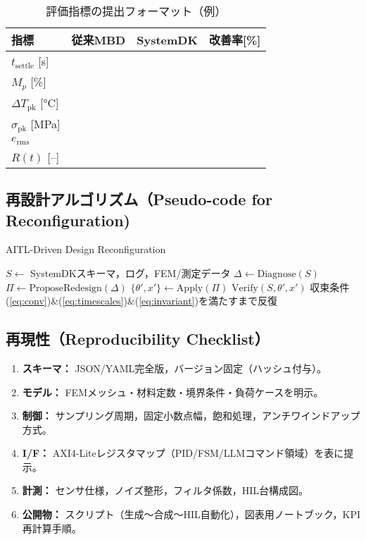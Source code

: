 \begin{table}[t]
\caption{評価指標の提出フォーマット（例）}
\label{tab:kpi}
\centering
\begin{tabular}{lccc}
\toprule
指標 & 従来MBD & SystemDK & 改善率[\%] \\
\midrule
$t_{\mathrm{settle}}$ [s] &  &  &  \\
$M_p$ [\%] &  &  &  \\
$\Delta T_{\mathrm{pk}}$ [°C] &  &  &  \\
$\sigma_{\mathrm{pk}}$ [MPa] &  &  &  \\
$e_{\mathrm{rms}}$ &  &  &  \\
$R(t)$ [--] &  &  &  \\
\bottomrule
\end{tabular}
\end{table}

\subsection*{再設計アルゴリズム（Pseudo-code for Reconfiguration)}
\begin{algorithm}[H]
\caption{AITL-Driven Design Reconfiguration}
\label{alg:reconf}
\begin{algorithmic}[1]
\STATE $S \leftarrow$ SystemDKスキーマ，ログ，FEM/測定データ
  \STATE $\Delta \leftarrow \mathrm{Diagnose}(S)$
  \STATE $\Pi \leftarrow \mathrm{ProposeRedesign}(\Delta)$ 
  \STATE $\{\theta',x'\} \leftarrow \mathrm{Apply}(\Pi)$ 
  \STATE $\mathrm{Verify}(S,\theta',x')$ 
\ENDIF
\STATE 収束条件(\ref{eq:conv})\&(\ref{eq:timescales})\&(\ref{eq:invariant})を満たすまで反復
\end{algorithmic}
\end{algorithm}

\subsection*{再現性（Reproducibility Checklist）}
\begin{enumerate}
  \item \textbf{スキーマ：} JSON/YAML完全版，バージョン固定（ハッシュ付与）。
  \item \textbf{モデル：} FEMメッシュ・材料定数・境界条件・負荷ケースを明示。
  \item \textbf{制御：} サンプリング周期，固定小数点幅，飽和処理，アンチワインドアップ方式。
  \item \textbf{I/F：} AXI4-Liteレジスタマップ（PID/FSM/LLMコマンド領域）を表に提示。
  \item \textbf{計測：} センサ仕様，ノイズ整形，フィルタ係数，HIL台構成図。
  \item \textbf{公開物：} スクリプト（生成～合成～HIL自動化），図表用ノートブック，KPI再計算手順。
\end{enumerate}
